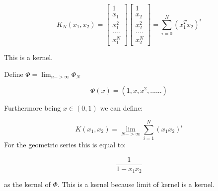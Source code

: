 \documentclass[12pt,letterpaper]{article}
\begin{document}
$$K_N(x_1, x_2) = \begin{bmatrix}1 \\ x_1 \\ x_1^2 \\....\\ x_1^N\end{bmatrix} \begin{bmatrix}1 \\ x_2 \\ x_2^2 \\....\\ x_2^N\end{bmatrix} = \sum_{i=0}^N (x_1^Tx_2)^i$$

This is a kernel.

Define $\Phi = \lim_{n->\infty}\Phi_N$

$$\Phi(x) = (1, x, x^2,......)$$

Furthermore being $x \in (0,1)$ we can define:

$$K(x_1, x_2) = \lim_{N->\infty}\sum_{i=1}^N(x_1x_2)^i$$
For the geometric series this is equal to:

$$\frac{1}{1-x_1x_2}$$

as the kernel of $\Phi$. This is a kernel because limit of kernel is a kernel.
\end{document}
